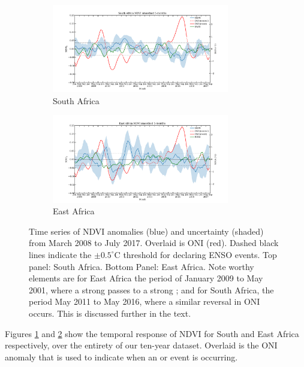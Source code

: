 \begin{figure}
  \centering
  \begin{subfigure}{\textwidth}
    \centering
    \includegraphics[width=0.85\textwidth]{figures/ndvi_oni_io_capetown_smoothed_5.pdf}
    \caption{South Africa}
    \label{fig:ndvi_t_south}
  \end{subfigure}
  \begin{subfigure}{\textwidth}
    \centering
    \includegraphics[width=0.85\textwidth]{figures/ndvi_oni_io_eastafrica_smoothed_5.pdf}
    \caption{East Africa}
    \label{fig:ndvi_t_east}
    \end{subfigure}
  \caption{Time series of NDVI anomalies (blue) and uncertainty
    (shaded) from March 2008 to July 2017. Overlaid is ONI
    (red). Dashed black lines indicate the $\pm0.5^{\circ}$C threshold
    for declaring ENSO events. Top panel: South Africa. Bottom Panel:
    East Africa. Note worthy elements are for East Africa the period
    of January 2009 to May 2001, where a strong \elnino{} passes to a
    strong \nina{}; and for South Africa, the period May 2011 to May
    2016, where a similar reversal in ONI occurs. This is discussed
    further in the text.}
  \label{fig:ndvi_temporal}
\end{figure}

Figures \ref{fig:ndvi_t_south} and \ref{fig:ndvi_t_east} show the
temporal response of NDVI for South and East Africa respectively, over
the entirety of our ten-year dataset. Overlaid is the ONI anomaly that
is used to indicate when an \elnino{} or \nina{} event is occurring.

